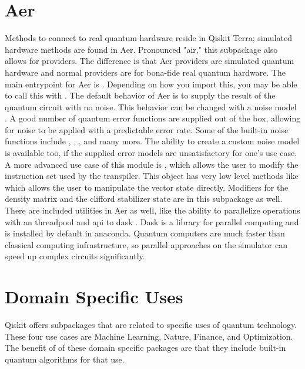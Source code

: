 \documentclass[conference]{IEEEtran}
\begin{document}
\section{Aer}
Methods to connect to real quantum hardware reside in Qiskit Terra; simulated hardware methods are found in Aer.
Pronounced "air," this subpackage also allows for providers. 
The difference is that Aer providers are simulated quantum hardware and normal providers are for bona-fide real quantum hardware. 
The main entrypoint for Aer is . 
Depending on how you import this, you may be able to call this with .
The default behavior of Aer is to supply the result of the quantum circuit with no noise. 
This behavior can be changed with a noise model \cite{b9}. 
A good number of quantum error functions are supplied out of the box, allowing for noise to be applied with a predictable error rate. 
Some of the built-in noise functions include , , , and many more. 
The ability to create a custom noise model is available too, if the supplied error models are unsatisfactory for one's use case. 
A more advanced use case of this module is , which allows the user to modify the instruction set used by the transpiler. 
This object has very low level methods like  which allows the user to manipulate the vector state directly.
Modifiers for the density matrix and the clifford stabilizer state are in this subpackage as well. 
There are included utilities in Aer as well, like the ability to parallelize operations with an threadpool and api to dask \cite{b10}.
Dask is a library for parallel computing and is installed by default in anaconda. 
Quantum computers are much faster than classical computing infrastructure, so parallel approaches on the simulator can speed up complex circuits significantly.

\section{Domain Specific Uses}
Qiskit offers subpackages that are related to specific uses of quantum technology. 
These four use cases are Machine Learning, Nature, Finance, and Optimization. 
The benefit of of these domain specific packages are that they include built-in quantum algorithms for that use. 
\end{document}
